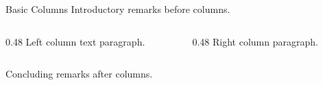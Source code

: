 \documentclass[14pt,t]{beamer-accessibility}
\begin{document}
\begin{frame}{Basic Columns}
Introductory remarks before columns.

\begin{columns}[T]
\begin{column}{0.48\textwidth}
Left column text paragraph.
\end{column}
\begin{column}{0.48\textwidth}
Right column paragraph.
\end{column}
\end{columns}

Concluding remarks after columns.
\end{frame}
\end{document}
